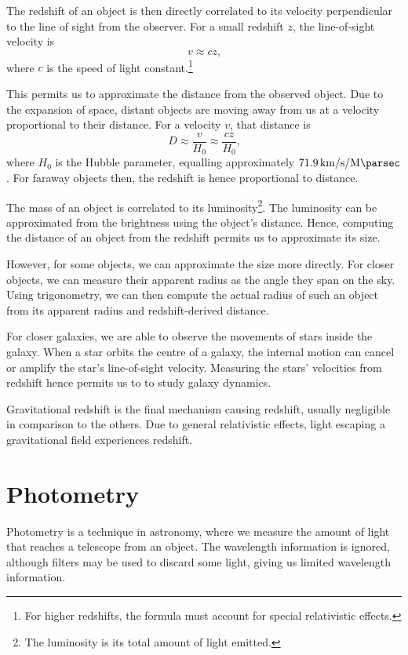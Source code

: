 \documentclass[11pt,twoside,openright]{report}
\begin{document}
  The redshift of an object is then directly correlated to its velocity perpendicular to the line of sight from the observer. For a small redshift $z$, the line-of-sight velocity is\[
      v \approx cz \text{,}
  \] where $c$ is the speed of light constant.\footnote{For higher redshifts, the formula must account for special relativistic effects.}

  This permits us to approximate the distance from the observed object. Due to the expansion of space, distant objects are moving away from us at a velocity proportional to their distance. For a velocity $v$, that distance is \[
      D \approx \frac{v}{H_0} \approx \frac{cz}{H_0} \text{,}
  \] where $H_0$ is the Hubble parameter, equalling approximately $\SI{71.9}{\kilo\meter\per\second\per\mega\parsec}$. For faraway objects then, the redshift is hence proportional to distance.

  The mass of an object is correlated to its luminosity\footnote{The luminosity is its total amount of light emitted.}. The luminosity can be approximated from the brightness using the object's distance. Hence, computing the distance of an object from the redshift permits us to approximate its size.

  However, for some objects, we can approximate the size more directly. For closer objects, we can measure their apparent radius as the angle they span on the sky. Using trigonometry, we can then compute the actual radius of such an object from its apparent radius and redshift-derived distance.

  For closer galaxies, we are able to observe the movements of stars inside the galaxy. When a star orbits the centre of a galaxy, the internal motion can cancel or amplify the star's line-of-sight velocity. Measuring the stars' velocities from redshift hence permits us to to study galaxy dynamics.

  Gravitational redshift is the final mechanism causing redshift, usually negligible in comparison to the others. Due to general relativistic effects, light escaping a gravitational field experiences redshift.

\chapter{Photometry}
\label{sec:photometry}

  Photometry is a technique in astronomy, where we measure the amount of light that reaches a telescope from an object. The wavelength information is ignored, although filters may be used to discard some light, giving us limited wavelength information. \citep{Photometry}
\end{document}
